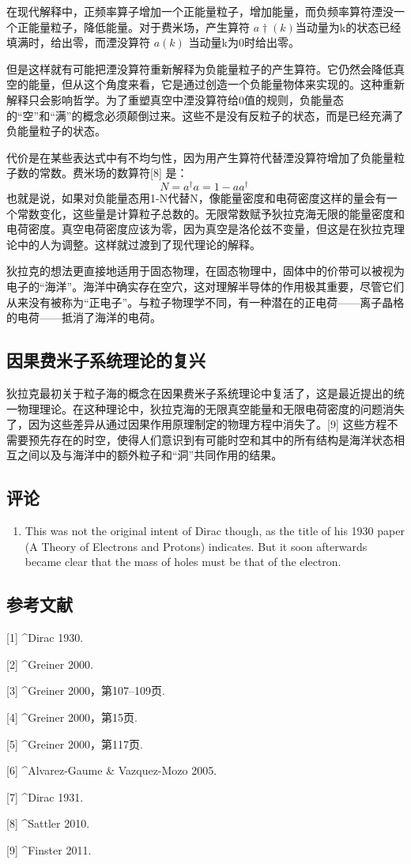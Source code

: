 在现代解释中，正频率算子增加一个正能量粒子，增加能量，而负频率算符湮没一个正能量粒子，降低能量。对于费米场，产生算符 $a\dagger(k)$当动量为k的状态已经填满时，给出零，而湮没算符 $a(k)$ 当动量k为0时给出零。

但是这样就有可能把湮没算符重新解释为负能量粒子的产生算符。它仍然会降低真空的能量，但从这个角度来看，它是通过创造一个负能量物体来实现的。这种重新解释只会影响哲学。为了重塑真空中湮没算符给0值的规则，负能量态的“空”和“满”的概念必须颠倒过来。这些不是没有反粒子的状态，而是已经充满了负能量粒子的状态。

代价是在某些表达式中有不均匀性，因为用产生算符代替湮没算符增加了负能量粒子数的常数。费米场的数算符[8] 是：
$${N} = {a}^\dagger {a} = 1 - {a} {a}^\dagger~$$
也就是说，如果对负能量态用1-N代替N，像能量密度和电荷密度这样的量会有一个常数变化，这些量是计算粒子总数的。无限常数赋予狄拉克海无限的能量密度和电荷密度。真空电荷密度应该为零，因为真空是洛伦兹不变量，但这是在狄拉克理论中的人为调整。这样就过渡到了现代理论的解释。

狄拉克的想法更直接地适用于固态物理，在固态物理中，固体中的价带可以被视为电子的“海洋”。海洋中确实存在空穴，这对理解半导体的作用极其重要，尽管它们从来没有被称为“正电子”。与粒子物理学不同，有一种潜在的正电荷——离子晶格的电荷——抵消了海洋的电荷。

\subsection{因果费米子系统理论的复兴}
狄拉克最初关于粒子海的概念在因果费米子系统理论中复活了，这是最近提出的统一物理理论。在这种理论中，狄拉克海的无限真空能量和无限电荷密度的问题消失了，因为这些差异从通过因果作用原理制定的物理方程中消失了。[9] 这些方程不需要预先存在的时空，使得人们意识到有可能时空和其中的所有结构是海洋状态相互之间以及与海洋中的额外粒子和“洞”共同作用的结果。

\subsection{评论}
\begin{enumerate}
\item This was not the original intent of Dirac though, as the title of his 1930 paper (A Theory of Electrons and Protons) indicates. But it soon afterwards became clear that the mass of holes must be that of the electron.
\end{enumerate}

\subsection{参考文献}
[1]
^Dirac 1930.

[2]
^Greiner 2000.

[3]
^Greiner 2000，第107–109页.

[4]
^Greiner 2000，第15页.

[5]
^Greiner 2000，第117页.

[6]
^Alvarez-Gaume & Vazquez-Mozo 2005.

[7]
^Dirac 1931.

[8]
^Sattler 2010.

[9]
^Finster 2011.
